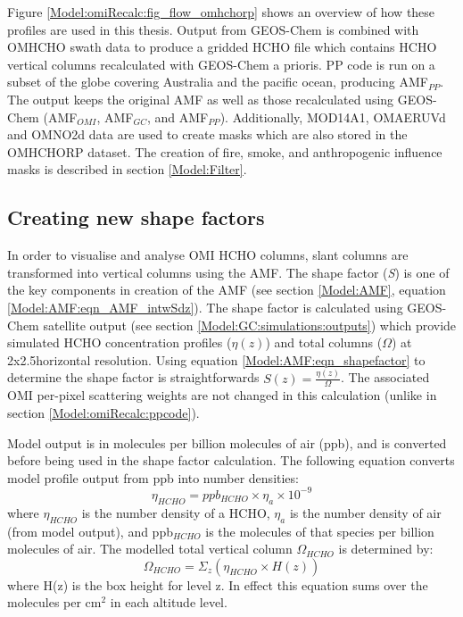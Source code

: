     
    Figure \ref{Model:omiRecalc:fig_flow_omhchorp} shows an overview of how these profiles are used in this thesis.
    Output from GEOS-Chem is combined with OMHCHO swath data to produce a gridded HCHO file which contains HCHO vertical columns recalculated with GEOS-Chem a prioris.
    PP code is run on a subset of the globe covering Australia and the pacific ocean, producing AMF$_{PP}$.
    The output keeps the original AMF as well as those recalculated using GEOS-Chem (AMF$_{OMI}$, AMF$_{GC}$, and AMF$_{PP}$).
    Additionally, MOD14A1, OMAERUVd and OMNO2d data are used to create masks which are also stored in the OMHCHORP dataset.
    The creation of fire, smoke, and anthropogenic influence masks is described in section \ref{Model:Filter}.
    
      
    
  \subsection{Creating new shape factors}
    In order to visualise and analyse OMI HCHO columns, slant columns are transformed into vertical columns using the AMF.
    The shape factor (\textit{S}) is one of the key components in creation of the AMF (see section \ref{Model:AMF}, equation \ref{Model:AMF:eqn_AMF_intwSdz}).
    The shape factor is calculated using GEOS-Chem satellite output (see section \ref{Model:GC:simulations:outputs}) which provide simulated HCHO concentration profiles ($\eta(z)$) and total columns ($\Omega$) at 2x2.5\degr horizontal resolution.
    Using equation \ref{Model:AMF:eqn_shapefactor} to determine the shape factor is straightforwards $S(z) = \frac{\eta(z)}{\Omega}$.
    The associated OMI per-pixel scattering weights are not changed in this calculation (unlike in section \ref{Model:omiRecalc:ppcode}).
    
    Model output is in molecules per billion molecules of air (ppb), and is converted before being used in the shape factor calculation.
    The following equation converts model profile output from ppb into number densities:
    \begin{equation} \label{Model:omiRecalc:eqn_ppb_to_n}
      \eta_{HCHO} = ppb_{HCHO} \times \eta_a \times 10^{-9}
    \end{equation}
    where $\eta_{HCHO}$ is the number density of a HCHO, $\eta_a$ is the number density of air (from model output), and ppb$_{HCHO}$ is the molecules of that species per billion molecules of air.
    The modelled total vertical column $\Omega_{HCHO}$ is determined by:
    \begin{equation*}
      \Omega_{HCHO} = \Sigma_z \left( \eta_{HCHO} \times H(z) \right)
    \end{equation*}
    where H(z) is the box height for level z.
    In effect this equation sums over the molecules per cm$^2$ in each altitude level.
    
